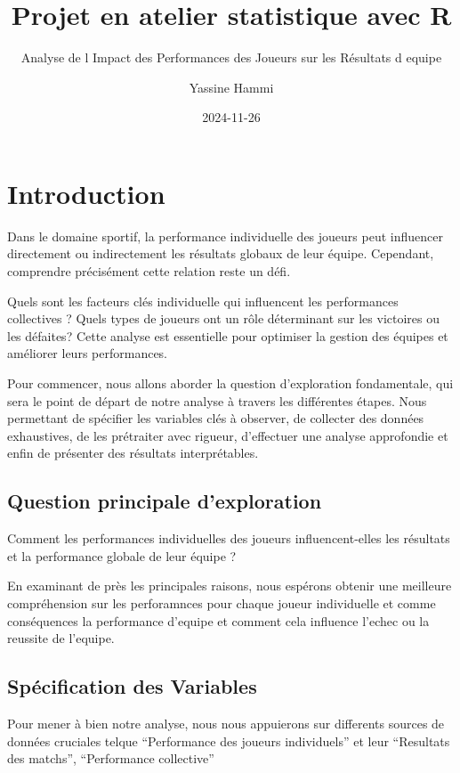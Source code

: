 \documentclass[
  6pt,
]{article}
\title{Projet en atelier statistique avec R}
\subtitle{Analyse de l Impact des Performances des Joueurs sur les
Résultats d equipe}
\author{Yassine Hammi}
\date{2024-11-26}
\begin{document}
\maketitle

{
\setcounter{tocdepth}{6}
\tableofcontents
}
\section{Introduction}\label{introduction}

Dans le domaine sportif, la performance individuelle des joueurs peut
influencer directement ou indirectement les résultats globaux de leur
équipe. Cependant, comprendre précisément cette relation reste un défi.

Quels sont les facteurs clés individuelle qui influencent les
performances collectives ? Quels types de joueurs ont un rôle
déterminant sur les victoires ou les défaites? Cette analyse est
essentielle pour optimiser la gestion des équipes et améliorer leurs
performances.

Pour commencer, nous allons aborder la question d'exploration
fondamentale, qui sera le point de départ de notre analyse à travers les
différentes étapes. Nous permettant de spécifier les variables clés à
observer, de collecter des données exhaustives, de les prétraiter avec
rigueur, d'effectuer une analyse approfondie et enfin de présenter des
résultats interprétables.

\subsection{Question principale
d'exploration}\label{question-principale-dexploration}

Comment les performances individuelles des joueurs influencent-elles les
résultats et la performance globale de leur équipe ?

En examinant de près les principales raisons, nous espérons obtenir une
meilleure compréhension sur les perforamnces pour chaque joueur
individuelle et comme conséquences la performance d'equipe et comment
cela influence l'echec ou la reussite de l'equipe.

\subsection{Spécification des
Variables}\label{spuxe9cification-des-variables}

Pour mener à bien notre analyse, nous nous appuierons sur differents
sources de données cruciales telque ``Performance des joueurs
individuels'' et leur ``Resultats des matchs'', ``Performance
collective''
\end{document}
